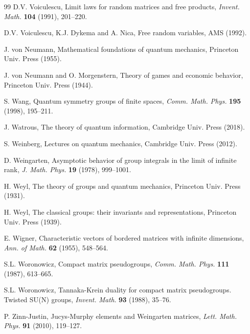 \documentclass[12pt]{amsbook}
\begin{document}
\begin{thebibliography}{99}
D.V. Voiculescu, Limit laws for random matrices and free products, {\em Invent. Math.} {\bf 104} (1991), 201--220.

D.V. Voiculescu, K.J. Dykema and A. Nica, Free random variables, AMS (1992).

J. von Neumann, Mathematical foundations of quantum mechanics, Princeton Univ. Press (1955).

J. von Neumann and O. Morgenstern, Theory of games and economic behavior, Princeton Univ. Press (1944).

S. Wang, Quantum symmetry groups of finite spaces, {\em Comm. Math. Phys.} {\bf 195} (1998), 195--211.

J. Watrous, The theory of quantum information, Cambridge Univ. Press (2018).

S. Weinberg, Lectures on quantum mechanics, Cambridge Univ. Press (2012).

D. Weingarten, Asymptotic behavior of group integrals in the limit of infinite rank, {\em J. Math. Phys.} {\bf 19} (1978), 999--1001.

H. Weyl, The theory of groups and quantum mechanics, Princeton Univ. Press (1931).

H. Weyl, The classical groups: their invariants and representations, Princeton Univ. Press (1939).

E. Wigner, Characteristic vectors of bordered matrices with infinite dimensions, {\em Ann. of Math.} {\bf 62} (1955), 548--564. 

S.L. Woronowicz, Compact matrix pseudogroups, {\em Comm. Math. Phys.} {\bf 111} (1987), 613--665.

S.L. Woronowicz, Tannaka-Krein duality for compact matrix pseudogroups. Twisted SU(N) groups, {\em Invent. Math.} {\bf 93} (1988), 35--76.

P. Zinn-Justin, Jucys-Murphy elements and Weingarten matrices, {\em Lett. Math. Phys.} {\bf 91} (2010), 119--127.

\end{thebibliography}

\baselineskip=14pt

\printindex
\end{document}
